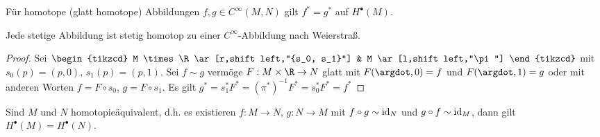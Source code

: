 \begin{kor} \label{6.20}
    Für homotope (glatt homotope) Abbildungen $f, g \in C^\infty(M, N)$ gilt $f^* = g^*$ auf $H^\bullet(M)$.
    \begin{note}
        Jede stetige Abbildung ist stetig homotop zu einer $C^\infty$-Abbildung nach Weierstraß.
    \end{note}
    \begin{proof}
        Sei
        \begin{math}
            \begin{tikzcd}
                M \times \R \ar[r,shift left,"{s_0, s_1}"] & M \ar[l,shift left,"\pi"]
            \end{tikzcd}
        \end{math}
        mit $s_0(p) = (p,0)$, $s_1(p) = (p, 1)$.
        Sei $f \sim g$ vermöge $F: M \times \R \to N$ glatt mit $F(\argdot, 0) = f$ und $F(\argdot, 1) = g$ oder mit anderen Worten $f = F \circ s_0$, $g = F \circ s_1$.
        Es gilt
        \begin{math}
            g^* = s_1^* F^*
            = (\pi^*)^{-1} F^*
            = s_0^* F^*
            = f^*
        \end{math}
    \end{proof}
\end{kor}

\begin{kor} \label{6.21}
    Sind $M$ und $N$ homotopieäquivalent, d.h. es existieren $f: M \to N$, $g: N \to M$ mit $f \circ g \sim \operatorname{id}_N$ und $g \circ f \sim \operatorname{id}_M$, dann gilt
    \begin{math}
        H^\bullet(M) = H^\bullet(N).
    \end{math}
\end{kor}







